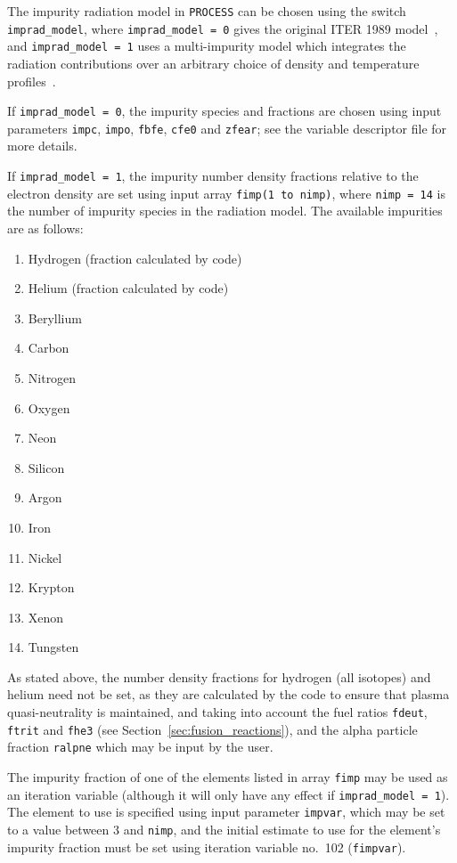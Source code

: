 \documentclass[11pt,a4paper]{report}
\newcommand{\process}{\mbox{\texttt{PROCESS}}}
\begin{document}
The impurity radiation model in \process\/ can be chosen using the switch
\texttt{imprad\_model}, where \texttt{imprad\_model = 0} gives the original
ITER 1989 model~\cite{kovari_physics}, and \texttt{imprad\_model = 1} uses a
multi-impurity model which integrates the radiation contributions over an
arbitrary choice of density and temperature profiles~\cite{hanni_radiation}.

If \texttt{imprad\_model = 0}, the impurity species and fractions are chosen
using input parameters \texttt{impc}, \texttt{impo}, \texttt{fbfe},
\texttt{cfe0} and \texttt{zfear}; see the variable descriptor file for more
details.

If \texttt{imprad\_model = 1}, the impurity number density fractions relative
to the electron density are set using input array \texttt{fimp(1 to nimp)},
where \texttt{nimp = 14} is the number of impurity species in the radiation
model. The available impurities are as follows:
\begin{enumerate}
\item Hydrogen (fraction calculated by code)
\item Helium (fraction calculated by code)
\item Beryllium
\item Carbon
\item Nitrogen
\item Oxygen
\item Neon
\item Silicon
\item Argon
\item Iron
\item Nickel
\item Krypton
\item Xenon
\item Tungsten
\end{enumerate}
As stated above, the number density fractions for hydrogen (all isotopes) and
helium need not be set, as they are calculated by the code to ensure that
plasma quasi-neutrality is maintained, and taking into account the fuel ratios
\texttt{fdeut}, \texttt{ftrit} and \texttt{fhe3} (see
Section~\ref{sec:fusion_reactions}), and the alpha particle fraction
\texttt{ralpne} which may be input by the user.

The impurity fraction of one of the elements listed in array \texttt{fimp} may
be used as an iteration variable (although it will only have any effect if
\texttt{imprad\_model = 1}). The element to use is specified using input
parameter \texttt{impvar}, which may be set to a value between 3 and
\texttt{nimp}, and the initial estimate to use for the element's impurity
fraction must be set using iteration variable no.\ 102 (\texttt{fimpvar}).
\end{document}
